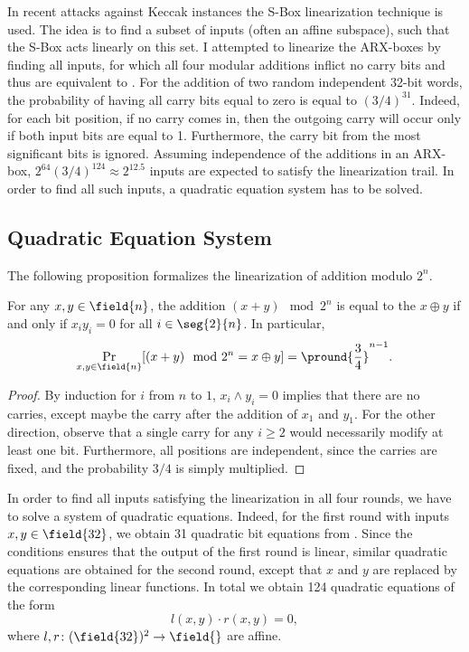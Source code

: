 
In recent attacks against Keccak instances \cite{KeccakLin1,KeccakLin2} the S-Box linearization technique is used. The idea is to find a subset of inputs (often an affine subspace), such that the S-Box acts linearly on this set. I attempted to linearize the ARX-boxes by finding all inputs, for which all four modular additions inflict no carry bits and thus are equivalent to \txor{}. For the addition of two random independent 32-bit words, the probability of having all carry bits equal to zero is equal to $(3/4)^{31}$. Indeed, for each bit position, if no carry comes in, then the outgoing carry will occur only if both input bits are equal to 1. Furthermore, the carry bit from the most significant bits is ignored. Assuming independence of the additions in an ARX-box, $2^{64}(3/4)^{124}\approx 2^{12.5}$ inputs are expected to satisfy the linearization trail. In order to find all such inputs, a quadratic equation system has to be solved.

\subsection{Quadratic Equation System}

The following proposition formalizes the linearization of addition modulo $2^n$.
\begin{proposition}
For any $x, y \in \field{n}$, the addition $(x+y)\mod{2^n}$ is equal to the \txor{} $x\oplus y$ if and only if $x_i y_i = 0$ for all $i \in \seg{2}{n}$. In particular, 
$$
\Pr_{x,y\in\field{n}}[(x+y)\mod{2^n} = x\oplus y] = \pround{\frac{3}{4}}^{n-1}.
$$
\end{proposition}
\begin{proof}
By induction for $i$ from $n$ to $1$, $x_i \land y_i = 0$ implies that there are no carries, except maybe the carry after the addition of $x_1$ and $y_1$. For the other direction, observe that a single carry for any $i \ge 2$ would necessarily modify at least one bit. Furthermore, all positions are independent, since the carries are fixed, and the probability $3/4$ is simply multiplied.
\end{proof}

In order to find all inputs satisfying the linearization in all four rounds, we have to solve a system of quadratic equations. Indeed, for the first round with inputs $x,y \in \field{32}$, we obtain 31 quadratic bit equations from . Since the conditions ensures that the output of the first round is linear, similar quadratic equations are obtained for the second round, except that $x$ and $y$ are replaced by the corresponding linear functions. In total we obtain 124 quadratic equations of the form
$$
l(x,y) \cdot r(x,y) = 0,
$$
where $l,r\colon (\field{32})^2 \to \field{}$ are affine.

